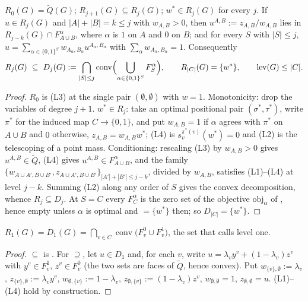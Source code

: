 \begin{lemma}\label{xc:conditioning}
$R_0(G)=\widetilde Q(G)$; $R_{j+1}(G)\subseteq R_j(G)$; $w^{\ast}\in R_j(G)$ for every $j$.  If
$u\in R_j(G)$ and $|A|+|B|=k\le j$ with $w_{A,B}>0$, then $u^{A,B}:=z_{A,B}/w_{A,B}$ lies in
$R_{j-k}(G)\cap F^{\alpha}_{A\cup B}$, where $\alpha$ is $1$ on $A$ and $0$ on $B$; and for every
$S$ with $|S|\le j$, $u=\sum_{\alpha\in\{0,1\}^{S}}w_{A_\alpha,B_\alpha}u^{A_\alpha,B_\alpha}$
with $\sum_\alpha w_{A_\alpha,B_\alpha}=1$.  Consequently
\[
  R_j(G)\ \subseteq\ D_j(G):=\bigcap_{|S|\le j}\operatorname{conv}
  \Bigl(\bigcup_{\alpha\in\{0,1\}^{S}}F^{\alpha}_{S}\Bigr),
  \qquad R_{|C|}(G)=\{w^{\ast}\},\qquad \operatorname{lev}(G)\le|C| .
\]
\end{lemma}

\begin{proof}
$R_0$ is (L3) at the single pair $(\emptyset,\emptyset)$ with $w=1$.  Monotonicity: drop the
variables of degree $j+1$.  $w^{\ast}\in R_j$: take an optimal positional pair $(\sigma^{\ast},\tau^{\ast})$, write $\pi^{\ast}$ for the induced map $C\to\{0,1\}$, and put
$w_{A,B}=1$ if $\alpha$ agrees with $\pi^{\ast}$ on $A\cup B$ and $0$ otherwise,
$z_{A,B}=w_{A,B}w^{\ast}$; (L4) is $s^{\pi^{\ast}(v)}_{v}(w^{\ast})=0$ and (L2) is the telescoping of a
point mass.  Conditioning: rescaling (L3) by $w_{A,B}>0$ gives $u^{A,B}\in\widetilde Q$, (L4)
gives $u^{A,B}\in F^{\alpha}_{A\cup B}$, and the family $\{w_{A\cup A',B\cup B'},
z_{A\cup A',B\cup B'}\}_{|A'|+|B'|\le j-k}$, divided by $w_{A,B}$, satisfies (L1)--(L4) at level
$j-k$.  Summing (L2) along any order of $S$ gives the convex decomposition, whence
$R_j\subseteq D_j$.  At $S=C$ every $F^{\alpha}_{C}$ is the zero set of the objective
$\mathrm{obj}_\alpha$ of , hence empty unless $\alpha$ is optimal
and $=\{w^{\ast}\}$ then; so $D_{|C|}=\{w^{\ast}\}$.
\end{proof}

\begin{proposition}\label{xc:level-one}
$R_1(G)=D_1(G)=\bigcap_{v\in C}\operatorname{conv}\bigl(F^{0}_{v}\cup F^{1}_{v}\bigr)$, the set
that  calls level one.
\end{proposition}

\begin{proof}
$\subseteq$ is .  For $\supseteq$, let $u\in D_1$ and, for each $v$, write
$u=\lambda_v y^{v}+(1-\lambda_v)z^{v}$ with $y^{v}\in F^{1}_{v}$, $z^{v}\in F^{0}_{v}$ (the two
sets are faces of $\widetilde Q$, hence convex).  Put $w_{\{v\},\emptyset}:=\lambda_v$,
$z_{\{v\},\emptyset}:=\lambda_vy^{v}$, $w_{\emptyset,\{v\}}:=1-\lambda_v$,
$z_{\emptyset,\{v\}}:=(1-\lambda_v)z^{v}$, $w_{\emptyset,\emptyset}=1$,
$z_{\emptyset,\emptyset}=u$.  (L1)--(L4) hold by construction.
\end{proof}

